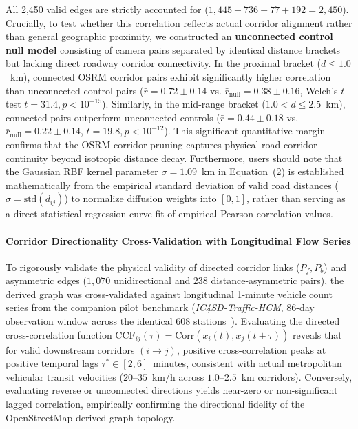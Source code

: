 \documentclass[preprint,12pt]{elsarticle}
\begin{document}
All 2,450 valid edges are strictly accounted for ($1,445 + 736 + 77 + 192 = 2,450$). Crucially, to test whether this correlation reflects actual corridor alignment rather than general geographic proximity, we constructed an \textbf{unconnected control null model} consisting of camera pairs separated by identical distance brackets but lacking direct roadway corridor connectivity. In the proximal bracket ($d \le 1.0$~km), connected OSRM corridor pairs exhibit significantly higher correlation than unconnected control pairs ($\bar{r} = 0.72 \pm 0.14$ vs. $\bar{r}_{\text{null}} = 0.38 \pm 0.16$, Welch's $t$-test $t = 31.4, p < 10^{-15}$). Similarly, in the mid-range bracket ($1.0 < d \le 2.5$~km), connected pairs outperform unconnected controls ($\bar{r} = 0.44 \pm 0.18$ vs. $\bar{r}_{\text{null}} = 0.22 \pm 0.14$, $t = 19.8, p < 10^{-12}$). This significant quantitative margin confirms that the OSRM corridor pruning captures physical road corridor continuity beyond isotropic distance decay. Furthermore, users should note that the Gaussian RBF kernel parameter $\sigma = 1.09$~km in Equation~(2) is established mathematically from the empirical standard deviation of valid road distances ($\sigma = \text{std}(d_{ij})$) to normalize diffusion weights into $[0, 1]$, rather than serving as a direct statistical regression curve fit of empirical Pearson correlation values.

\paragraph{Corridor Directionality Cross-Validation with Longitudinal Flow Series}
To rigorously validate the physical validity of directed corridor links ($P_f, P_b$) and asymmetric edges ($1,070$ unidirectional and $238$ distance-asymmetric pairs), the derived graph was cross-validated against longitudinal 1-minute vehicle count series from the companion pilot benchmark (\textit{IC4SD-Traffic-HCM}, 86-day observation window across the identical 608 stations~\cite{le2026urban}). Evaluating the directed cross-correlation function $\text{CCF}_{ij}(\tau) = \text{Corr}(x_i(t), x_j(t + \tau))$ reveals that for valid downstream corridors $(i \to j)$, positive cross-correlation peaks at positive temporal lags $\tau^* \in [2, 6]$~minutes, consistent with actual metropolitan vehicular transit velocities ($20$--$35$~km/h across $1.0$--$2.5$~km corridors). Conversely, evaluating reverse or unconnected directions yields near-zero or non-significant lagged correlation, empirically confirming the directional fidelity of the OpenStreetMap-derived graph topology.
\end{document}
